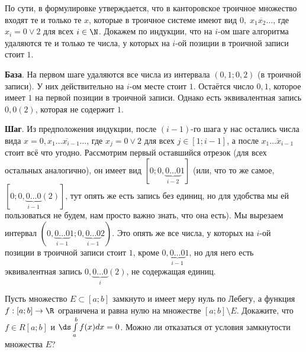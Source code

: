 \begin{solution}
    По сути, в формулировке утверждается, что в канторовское троичное множество входят те и только те $x$, которые в троичное системе имеют вид $0{,}\!\;\overline{x_1x_2\ldots}$, где $x_i = 0 \vee 2$ для всех $i \in \N$. Докажем по индукции, что на $i$-ом шаге алгоритма удаляются те и только те числа, у которых на $i$-ой позиции в троичной записи стоит $1$.

    \textbf{База}. На первом шаге удаляются все числа из интервала $(0{,}1; 0{,}2)$ (в троичной записи). У них действительно на $i$-ом месте стоит $1$. Остаётся число $0{,}1$, которое имеет $1$ на первой позиции в троичной записи. Однако есть эквивалентная запись $0{,}0(2)$, которая не содержит $1$.

    \textbf{Шаг}. Из предположения индукции, после $(i - 1)$-го шага у нас остались числа вида $x = 0{,}\overline{x_1\ldots x_{i - 1}\ldots}$, где $x_j = 0 \vee 2$ для всех $j \in [1; i - 1]$, а после $\overline{x_1\ldots x_{i - 1}}$ стоит всё что угодно. Рассмотрим первый оставшийся отрезок (для всех остальных аналогично), он имеет вид $[0; 0,\underbrace{0\ldots 0}_{i - 2}1]$ (или, что то же самое, $[0; 0,\underbrace{0\ldots 0}_{i - 1}(2)]$, тут опять же есть запись без единиц, но для удобства мы ей пользоваться не будем, нам просто важно знать, что она есть). Мы вырезаем интервал $(0{,}\underbrace{0\ldots 0}_{i - 1}1; 0{,}\underbrace{0\ldots 0}_{i - 1}2)$. Это опять же все числа, у которых на $i$-ой позиции в троичной записи стоит $1$, кроме $0{,}\underbrace{0\ldots 0}_{i - 1}1$, но для него есть эквивалентная запись $0{,}\underbrace{0\ldots 0}_{i}(2)$, не содержащая единиц.
\end{solution}

\begin{problem}[9]
    Пусть множество $E \subset [a; b]$ замкнуто и имеет меру нуль по Лебегу, а функция $f: [a; b] \to \R$ ограничена и равна нулю на множестве $[a; b] \setminus E$. Докажите, что $f \in R[a; b]$ и $\ds\int\limits_a^bf(x)dx = 0$. Можно ли отказаться от условия замкнутости множества $E$?
\end{problem}

